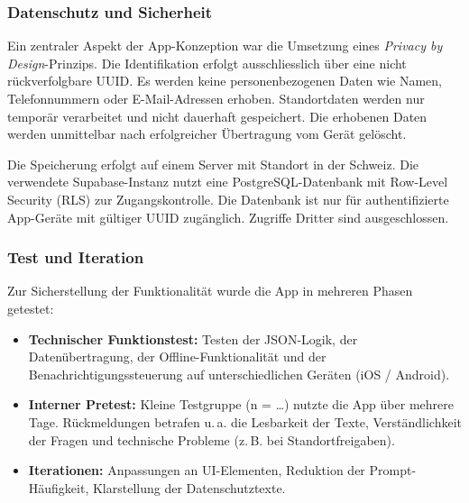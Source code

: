 
\subsubsection{Datenschutz und Sicherheit}
Ein zentraler Aspekt der App-Konzeption war die Umsetzung eines \textit{Privacy by Design}-Prinzips. Die Identifikation erfolgt ausschliesslich über eine nicht rückverfolgbare UUID. Es werden keine personenbezogenen Daten wie Namen, Telefonnummern oder E-Mail-Adressen erhoben. Standortdaten werden nur temporär verarbeitet und nicht dauerhaft gespeichert. Die erhobenen Daten werden unmittelbar nach erfolgreicher Übertragung vom Gerät gelöscht.

Die Speicherung erfolgt auf einem Server mit Standort in der Schweiz. Die verwendete Supabase-Instanz nutzt eine PostgreSQL-Datenbank mit Row-Level Security (RLS) zur Zugangskontrolle. Die Datenbank ist nur für authentifizierte App-Geräte mit gültiger UUID zugänglich. Zugriffe Dritter sind ausgeschlossen.


\subsubsection{Test und Iteration}
Zur Sicherstellung der Funktionalität wurde die App in mehreren Phasen getestet:
\begin{itemize}
  \item \textbf{Technischer Funktionstest:} Testen der JSON-Logik, der Datenübertragung, der Offline-Funktionalität und der Benachrichtigungssteuerung auf unterschiedlichen Geräten (iOS / Android).
  \item \textbf{Interner Pretest:} Kleine Testgruppe (n = …) nutzte die App über mehrere Tage. Rückmeldungen betrafen u.\,a. die Lesbarkeit der Texte, Verständlichkeit der Fragen und technische Probleme (z. B. bei Standortfreigaben).
  \item \textbf{Iterationen:} Anpassungen an UI-Elementen, Reduktion der Prompt-Häufigkeit, Klarstellung der Datenschutztexte.
\end{itemize}


